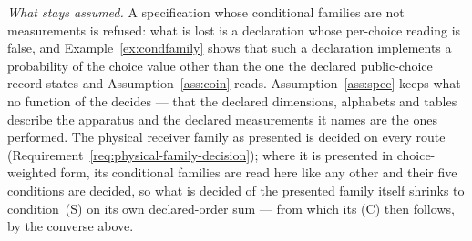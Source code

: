 \begin{remark}
\emph{What stays assumed.} A specification whose
conditional families are not measurements is refused: what is lost is a
declaration whose per-choice reading is false, and Example~\ref{ex:condfamily}
shows that such a declaration implements a probability of the choice value
other than the one the declared public-choice record states and
Assumption~\ref{ass:coin} reads. Assumption~\ref{ass:spec}
keeps what no function of the  decides --- that the declared
dimensions, alphabets and tables describe the apparatus and the
declared measurements it names are the ones performed. The physical
receiver family as presented is decided on every route
(Requirement~\ref{req:physical-family-decision}); where it is presented in
choice-weighted form, its conditional families are read here like any other
and their five conditions are decided, so what is decided of the presented
family itself shrinks to condition~(S) on its own declared-order sum ---
from which its (C) then follows, by the converse above.
\end{remark}
